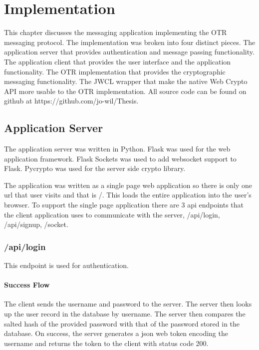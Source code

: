 \chapter{Implementation}


This chapter discusses the messaging application implementing the OTR messaging protocol. The implementation was broken into four distinct pieces. The application server that provides authentication and message passing functionality. The application client that provides the user interface and the application functionality. The OTR implementation that provides the cryptographic messaging functionality. The JWCL wrapper that make the native Web Crypto API more usable to the OTR implementation. All source code can be found on github at https://github.com/jo-wil/Thesis.


\section{Application Server}


The application server was written in Python. Flask was used for the web application framework. \cite{flask} Flask Sockets was used to add websocket support to Flask. \cite{flask-sockets} Pycrypto was used for the server side crypto library. \cite{pycrypto}


The application was written as a single page web application so there is only one url that user visits and that is /. This loads the entire application into the user's browser. To support the single page application there are 3 api endpoints that the client application uses to communicate with the server, /api/login, /api/signup, /socket.


\subsection{/api/login}


This endpoint is used for authentication. 


\subsubsection{Success Flow}


The client sends the username and password to the server. The server then looks up the user record in the database by username. The server then compares the salted hash of the provided password with that of the password stored in the database. On success, the server generates a json web token encoding the username and returns the token to the client with status code 200.


